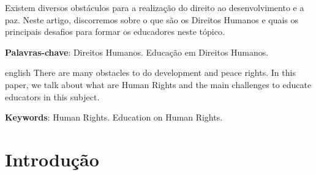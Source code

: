 \documentclass[
	article,			%
	11pt,				%
	oneside,			%
	a4paper,			%
	english,			%
	brazil,				%
	sumario=tradicional
]{abntex2}
\begin{document}

\frenchspacing


\maketitle

\begin{resumoumacoluna}
 Existem diversos obstáculos para a realização do direito ao desenvolvimento
 e a paz. Neste artigo, discorremos sobre o que são os Direitos Humanos e quais
 os principais desafios para formar os educadores neste tópico. 


 \vspace{\onelineskip}
 
 \noindent
 \textbf{Palavras-chave}: Direitos Humanos. Educação em Direitos Humanos.
\end{resumoumacoluna}


\renewcommand{\resumoname}{Abstract}
\begin{resumoumacoluna}
 \begin{otherlanguage*}{english}
   There are many obstacles to do development and peace rights. In this paper,
   we talk about what are Human Rights and the main challenges to educate
   educators in this subject.

   \vspace{\onelineskip}
 
   \noindent
   \textbf{Keywords}: Human Rights. Education on Human Rights.
 \end{otherlanguage*}  
\end{resumoumacoluna}

\textual

\section{Introdução}
\end{document}
